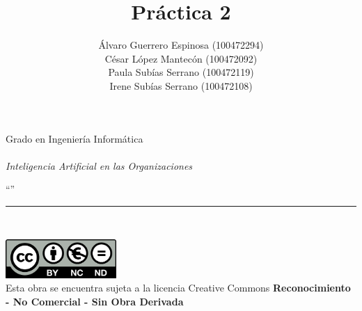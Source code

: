 \documentclass[12pt]{report} %
\begin{document}

\title{Práctica 2}
\author{Álvaro Guerrero Espinosa (100472294)\\
        César López Mantecón (100472092)\\
        Paula Subías Serrano (100472119)\\
        Irene Subías Serrano (100472108)\\}

\makeatletter
\begin{titlepage}
    \begin{sffamily}
    \color{azulUC3M}
    \begin{center}
        \begin{figure}[H] %
        \end{figure}
        \vspace{2.5cm}
        \begin{Large}
            Grado en Ingeniería Informática\\
            \@date\\
            \vspace{2cm}
            \textsl{Inteligencia Artificial en las Organizaciones}\\
            \bigskip
        \end{Large}
        {\Huge ``\@title''}\\
        \vspace*{0.5cm}
        \rule{10.5cm}{0.1mm}\\
        \vspace*{0.9cm}
        {\LARGE\@author}
        \vspace*{1cm}
    \end{center}
    \vfill
    \color{black}
    \includegraphics[width=4.2cm]{imagenes/creativecommons.png}\\ %
    Esta obra se encuentra sujeta a la licencia Creative Commons \textbf{Reconocimiento - No Comercial - Sin Obra Derivada}
    \end{sffamily}
\end{titlepage}
\makeatother
\end{document}
